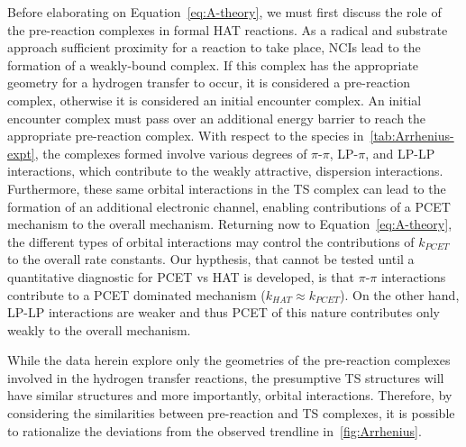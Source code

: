\begin{doublespace}
Before elaborating on Equation~\ref{eq:A-theory}, we must first discuss the role
of the pre-reaction complexes in formal HAT reactions. As a radical and
substrate approach sufficient proximity for a reaction to take place, NCIs lead
to the formation of a weakly-bound complex. If this complex has the appropriate
geometry for a hydrogen transfer to occur, it is considered a pre-reaction
complex, otherwise it is considered an initial encounter complex. An initial
encounter complex must pass over an additional energy barrier to reach the
appropriate pre-reaction complex. With respect to the species
in~\ref{tab:Arrhenius-expt}, the complexes formed involve various degrees of
$\pi$-$\pi$, LP-$\pi$, and LP-LP interactions, which contribute to the weakly
attractive, dispersion interactions. Furthermore, these same orbital
interactions in the TS complex can lead to the formation of an additional
electronic channel, enabling contributions of a PCET mechanism to the overall
mechanism.\cite{DiLabio2005, DiLabio2007} Returning now to
Equation~\ref{eq:A-theory}, the different types of orbital interactions may
control the contributions of $k_{PCET}$ to the overall rate constants. Our
hypthesis, that cannot be tested until a quantitative diagnostic for PCET vs HAT
is developed, is that $\pi$-$\pi$ interactions contribute to a PCET dominated
mechanism ($k_{HAT} \approx k_{PCET}$). On the other hand, LP-LP interactions
are weaker and thus PCET of this nature contributes only weakly to the overall
mechanism.

While the data herein explore only the geometries of the pre-reaction complexes
involved in the hydrogen transfer reactions, the presumptive TS structures will
have similar structures and more importantly, orbital interactions. Therefore,
by considering the similarities between pre-reaction and TS complexes, it is
possible to rationalize the deviations from the observed trendline
in~\ref{fig:Arrhenius}.


\end{doublespace}
